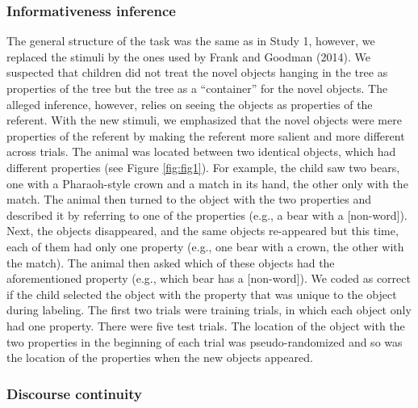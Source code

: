 \documentclass[
  english,
  man,floatsintext]{apa6}
\begin{document}
\hypertarget{informativeness-inference-1}{%
\subsubsection{Informativeness inference}\label{informativeness-inference-1}}

The general structure of the task was the same as in Study 1, however, we replaced the stimuli by the ones used by Frank and Goodman (2014). We suspected that children did not treat the novel objects hanging in the tree as properties of the tree but the tree as a ``container'' for the novel objects. The alleged inference, however, relies on seeing the objects as properties of the referent. With the new stimuli, we emphasized that the novel objects were mere properties of the referent by making the referent more salient and more different across trials. The animal was located between two identical objects, which had different properties (see Figure \ref{fig:fig1}). For example, the child saw two bears, one with a Pharaoh-style crown and a match in its hand, the other only with the match. The animal then turned to the object with the two properties and described it by referring to one of the properties (e.g., a bear with a {[}non-word{]}). Next, the objects disappeared, and the same objects re-appeared but this time, each of them had only one property (e.g., one bear with a crown, the other with the match). The animal then asked which of these objects had the aforementioned property (e.g., which bear has a {[}non-word{]}). We coded as correct if the child selected the object with the property that was unique to the object during labeling. The first two trials were training trials, in which each object only had one property. There were five test trials. The location of the object with the two properties in the beginning of each trial was pseudo-randomized and so was the location of the properties when the new objects appeared.

\hypertarget{discourse-continuity}{%
\subsubsection{Discourse continuity}\label{discourse-continuity}}
\end{document}
